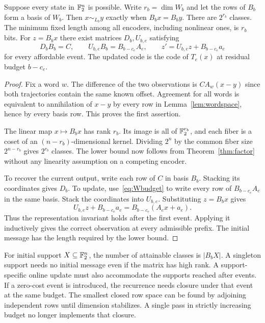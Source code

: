 \begin{theorem}\label{thm:linear}
Suppose every state in $\mathbb F_2^n$ is possible. Write $r_b=\dim W_b$ and let the rows of $B_b$ form a basis of $W_b$. Then $x\sim_{L_b}y$ exactly when $B_bx=B_by$. There are $2^{r_b}$ classes. The minimum fixed length among all encoders, including nonlinear ones, is $r_b$ bits. For $z=B_bx$ there exist matrices $D_b,U_{b,e}$ satisfying
\[
D_b B_b=C,\qquad U_{b,e}B_b=B_{b-c_e}A_e,\qquad
z'=U_{b,e}z+B_{b-c_e}a_e
\]
for every affordable event. The updated code is the code of $T_e(x)$ at residual budget $b-c_e$.
\end{theorem}
\begin{proof}
Fix a word $w$. The difference of the two observations is $CA_w(x-y)$ since both trajectories contain the same known offset. Agreement for all words is equivalent to annihilation of $x-y$ by every row in Lemma~\ref{lem:wordspace}, hence by every basis row. This proves the first assertion.

The linear map $x\mapsto B_bx$ has rank $r_b$. Its image is all of $\mathbb F_2^{r_b}$, and each fiber is a coset of an $(n-r_b)$-dimensional kernel. Dividing $2^n$ by the common fiber size $2^{n-r_b}$ gives $2^{r_b}$ classes. The lower bound now follows from Theorem~\ref{thm:factor} without any linearity assumption on a competing encoder.

To recover the current output, write each row of $C$ in basis $B_b$. Stacking its coordinates gives $D_b$. To update, use~\eqref{eq:Wbudget} to write every row of $B_{b-c_e}A_e$ in the same basis. Stack the coordinates into $U_{b,e}$. Substituting $z=B_bx$ gives
\[
U_{b,e}z+B_{b-c_e}a_e=B_{b-c_e}(A_ex+a_e).
\]
Thus the representation invariant holds after the first event. Applying it inductively gives the correct observation at every admissible prefix. The initial message has the length required by the lower bound.
\end{proof}

For initial support $X\subseteq\mathbb F_2^n$, the number of attainable classes is $|B_bX|$. A singleton support needs no initial message even if the matrix has high rank. A support-specific online update must also accommodate the supports reached after events. If a zero-cost event is introduced, the recurrence needs closure under that event at the same budget. The smallest closed row space can be found by adjoining independent rows until dimension stabilizes. A single pass in strictly increasing budget no longer implements that closure.

